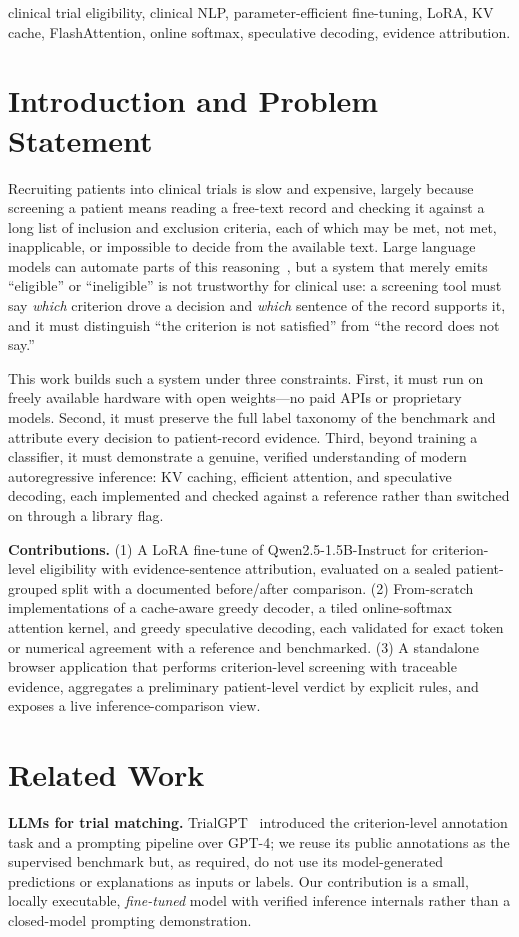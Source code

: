 \documentclass[conference]{IEEEtran}
\begin{document}
\begin{IEEEkeywords}
clinical trial eligibility, clinical NLP, parameter-efficient fine-tuning, LoRA,
KV cache, FlashAttention, online softmax, speculative decoding, evidence
attribution.
\end{IEEEkeywords}

\section{Introduction and Problem Statement}
Recruiting patients into clinical trials is slow and expensive, largely because
screening a patient means reading a free-text record and checking it against a
long list of inclusion and exclusion criteria, each of which may be met, not
met, inapplicable, or impossible to decide from the available text. Large
language models can automate parts of this reasoning~\cite{jin2024trialgpt}, but
a system that merely emits ``eligible'' or ``ineligible'' is not trustworthy for
clinical use: a screening tool must say \emph{which} criterion drove a decision
and \emph{which} sentence of the record supports it, and it must distinguish
``the criterion is not satisfied'' from ``the record does not say.''

This work builds such a system under three constraints. First, it must run on
freely available hardware with open weights---no paid APIs or proprietary
models. Second, it must preserve the full label taxonomy of the benchmark and
attribute every decision to patient-record evidence. Third, beyond training a
classifier, it must demonstrate a genuine, verified understanding of modern
autoregressive inference: KV caching, efficient attention, and speculative
decoding, each implemented and checked against a reference rather than switched
on through a library flag.

\textbf{Contributions.} (1) A LoRA fine-tune of Qwen2.5-1.5B-Instruct for
criterion-level eligibility with evidence-sentence attribution, evaluated on a
sealed patient-grouped split with a documented before/after comparison. (2)
From-scratch implementations of a cache-aware greedy decoder, a tiled
online-softmax attention kernel, and greedy speculative decoding, each validated
for exact token or numerical agreement with a reference and benchmarked. (3) A
standalone browser application that performs criterion-level screening with
traceable evidence, aggregates a preliminary patient-level verdict by explicit
rules, and exposes a live inference-comparison view.

\section{Related Work}
\textbf{LLMs for trial matching.} TrialGPT~\cite{jin2024trialgpt} introduced the
criterion-level annotation task and a prompting pipeline over GPT-4; we reuse its
public annotations as the supervised benchmark but, as required, do not use its
model-generated predictions or explanations as inputs or labels. Our contribution
is a small, locally executable, \emph{fine-tuned} model with verified inference
internals rather than a closed-model prompting demonstration.
\end{document}
